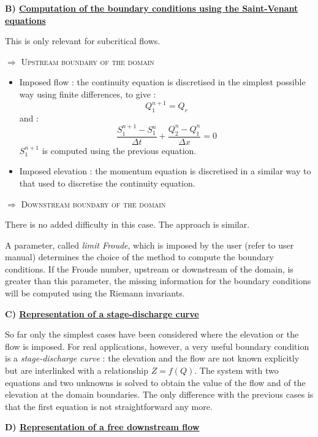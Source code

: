 \textbf{B) \underline{Computation of the boundary conditions using the Saint-Venant equations}}

This is only relevant for subcritical flows.

$\Longrightarrow$ \textsc{Upstream boundary of the domain}

\begin{itemize}
 \item Imposed flow : the continuity equation is discretised in the simplest possible way using finite differences, to give :
   \begin{equation}
     Q_{1}^{n+1} = Q_r
   \end{equation}
   and :
   \begin{equation}
     \frac{S_{1}^{n+1}-S_{1}^{n}}{\Delta t} + \frac{Q_{2}^n - Q_{1}^n}{\Delta x} = 0
   \end{equation}
   $S_{1}^{n+1}$ is computed using the previous equation.
 \item Imposed elevation : the momentum equation is discretised in a similar way to that used to discretise the continuity equation.
\end{itemize}

$\Longrightarrow$ \textsc{Downstream boundary of the domain}

There is no added difficulty in this case. The approach is similar.

A parameter, called \textit{limit Froude}, which is imposed by the user (refer to user manual) determines the choice of the method to compute the boundary conditions. If the Froude number, upstream or downstream of the domain, is greater than this parameter, the missing information for the boundary conditions will be computed using the Riemann invariants.

\textbf{C) \underline{Representation of a stage-discharge curve}}

So far only the simplest cases have been considered where the elevation or the flow is imposed. For real applications, however, a very useful boundary condition is a \textit{stage-discharge curve} : the elevation and the flow are not known explicitly but are interlinked with a relationship $Z = f(Q)$. The system with two equations and two unknowns is solved to obtain the value of the flow and of the elevation at the domain boundaries. The only difference with the previous cases is that the first equation is not straightforward any more.

\textbf{D) \underline{Representation of a free downstream flow}}

